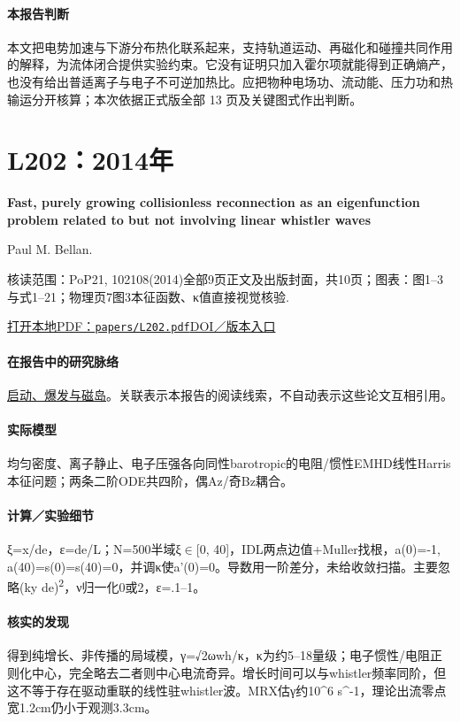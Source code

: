 \paragraph{本报告判断}本文把电势加速与下游分布热化联系起来，支持轨道运动、再磁化和碰撞共同作用的解释，为流体闭合提供实验约束。它没有证明只加入霍尔项就能得到正确熵产，也没有给出普适离子与电子不可逆加热比。应把物种电场功、流动能、压力功和热输运分开核算；本次依据正式版全部 13 页及关键图式作出判断。

\section{L202：2014年}\label{paper:L202}

\textbf{Fast,  purely growing collisionless reconnection as an eigenfunction problem related to but not involving linear whistler waves}\citep{L202}\

Paul M. Bellan.

\textsf{核读范围：}PoP21, 102108(2014)全部9页正文及出版封面，共10页；\textsf{图表：}图1–3与式1–21；物理页7图3本征函数、κ值直接视觉核验.

\href{run:papers/L202.pdf}{打开本地PDF：\texttt{papers/L202.pdf}}\quad\href{https://doi.org/10.1063/1.4897375}{DOI／版本入口}

\paragraph{在报告中的研究脉络}\hyperref[story:onset]{启动、爆发与磁岛}。关联表示本报告的阅读线索，不自动表示这些论文互相引用。

\paragraph{实际模型}均匀密度、离子静止、电子压强各向同性barotropic的电阻/惯性EMHD线性Harris本征问题；两条二阶ODE共四阶，偶Az/奇Bz耦合。

\paragraph{计算／实验细节}ξ=x/de，ε=de/L；N=500半域ξ\ensuremath{\in}[0, 40]，IDL两点边值+Muller找根，a(0)=-1, a(40)=s(0)=s(40)=0，并调κ使a'(0)=0。导数用一阶差分，未给收敛扫描。主要忽略(ky de)\textsuperscript{2}，ν归一化0或2，ε=.1–1。

\paragraph{核实的发现}得到纯增长、非传播的局域模，γ=√2ωwh/κ，κ为约5–18量级；电子惯性/电阻正则化中心，完全略去二者则中心电流奇异。增长时间可以与whistler频率同阶，但这不等于存在驱动重联的线性驻whistler波。MRX估γ约10\textasciicircum{}6 s\textasciicircum{}-1，理论出流零点宽1.2cm仍小于观测3.3cm。

